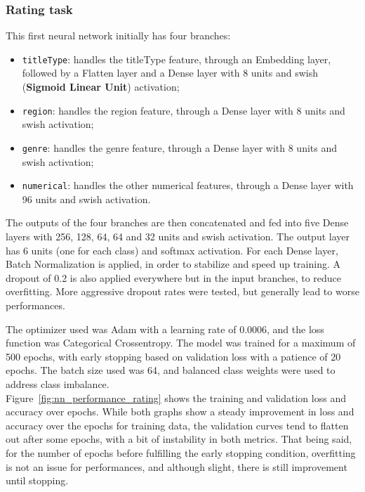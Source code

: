 \subsubsection{Rating task}
This first neural network initially has four branches:
\begin{itemize}
    \item \texttt{titleType}: handles the titleType feature, through
    an Embedding layer, followed by a Flatten layer and
    a Dense layer with 8 units and swish (\textbf{Sigmoid Linear Unit})
    activation;
    \item \texttt{region}: handles the region feature, through
    a Dense layer with 8 units and swish activation;
    \item \texttt{genre}: handles the genre feature, through
    a Dense layer with 8 units and swish activation;
    \item \texttt{numerical}: handles the other numerical
    features, through a Dense layer with 96 units
    and swish activation.
\end{itemize}
The outputs of the four branches are then concatenated and
fed into five Dense layers with 256, 128, 64, 64 and 32 units and
swish activation.
The output layer has 6 units (one for each class) and
softmax activation.
For each Dense layer, Batch Normalization is applied,
in order to stabilize and speed up training.
A dropout of 0.2 is also applied everywhere but in the input
branches, to reduce overfitting. More aggressive dropout rates
were tested, but generally lead to worse performances.

The optimizer used was Adam with a learning rate of 0.0006,
and the loss function was Categorical Crossentropy.
The model was trained for a maximum of 500 epochs, with early
stopping based on validation loss with a patience of 20 epochs.
The batch size used was 64, and balanced class weights were used to
address class imbalance.\\


Figure~\ref{fig:nn_performance_rating}
shows the training and validation loss and accuracy over epochs.
While both graphs show a steady improvement in loss and accuracy
over the epochs for training data, the validation curves
tend to flatten out after some epochs, with a bit of instability
in both metrics.
That being said, for the number of epochs before fulfilling
the early stopping condition, overfitting is not an issue for
performances, and although slight, there is still improvement
until stopping.\\


